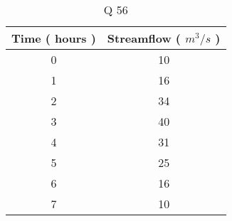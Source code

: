 \begin{table}[h]
\centering
\caption{Q 56}
\begin{tabular}{|c|c|}
\hline
Time ( hours ) & Streamflow ( $m^3/s$ ) \\
\hline
0 & 10 \\
\hline
1 & 16 \\
\hline
2 & 34 \\
\hline
3 & 40 \\
\hline
4 & 31 \\
\hline
5 & 25 \\
\hline
6 & 16 \\
\hline 
7 & 10 \\
\hline
\end{tabular}
\label{tab: Q_56}
\end{table}
